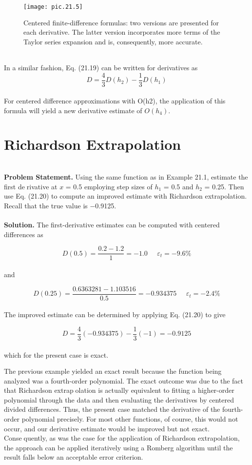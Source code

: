 \begin{figure}[hbt!]
	\centering
	\texttt{[image: pic.21.5]}
	\caption{\textsf{Centered finite-difference formulas: two versions are presented for each derivative. The latter
version incorporates more terms of the Taylor series expansion and is, consequently, more
accurate.
}} \hline
	\label{pic.21.5}
\end{figure}\\
In a similar fashion, Eq. (21.19) can be written for derivatives as
\begin{equation}
	\tag{21.20}
	D= \dfrac{4}{3}D(h_{2}) - \dfrac{1}{3}D(h_{1})
\end{equation}\\
For centered difference approximations with O(h2), the application of this formula will
yield a new derivative estimate of $O(h_{4})$.

\vspace{0,6in}
\chapter{Richardson Extrapolation}
\vspace{0,1in}
\hline\\
\vspace{0,1in}
\textbf{Problem Statement.} Using the same function as in Example 21.1, estimate the first derivative at $x$ = 0.5 employing step sizes of $h_{1}$ = 0.5 and $h_{2}$ = 0.25. Then use Eq. (21.20)
to compute an improved estimate with Richardson extrapolation. Recall that the true value
is −0.9125.\\
\vspace{0.2in}\\
\textbf{Solution.} The first-derivative estimates can be computed with centered differences as

	$$D(0.5) = \dfrac{0.2 - 1.2}{1} = - 1.0 \; \; \; \; \; \varepsilon_{t} = -9.6\%$$\\
and

	$$D(0.25) = \dfrac{0.6363281 - 1.103516}{0.5} = -0.934375 \; \; \; \; \; \varepsilon_{t} = -2.4\%$$\\
The improved estimate can be determined by applying Eq. (21.20) to give

	$$D = \dfrac{4}{3}(-0.934375) -\dfrac{1}{3}(-1) = -0.9125$$\\
which for the present case is exact.
\vspace{0.2in}

The previous example yielded an exact result because the function being analyzed was
a fourth-order polynomial. The exact outcome was due to the fact that Richardson extrapolation is actually equivalent to fitting a higher-order polynomial through the data and then
evaluating the derivatives by centered divided differences. Thus, the present case matched
the derivative of the fourth-order polynomial precisely. For most other functions, of course,
this would not occur, and our derivative estimate would be improved but not exact. Consequently, as was the case for the application of Richardson extrapolation, the approach can
be applied iteratively using a Romberg algorithm until the result falls below an acceptable
error criterion. 

